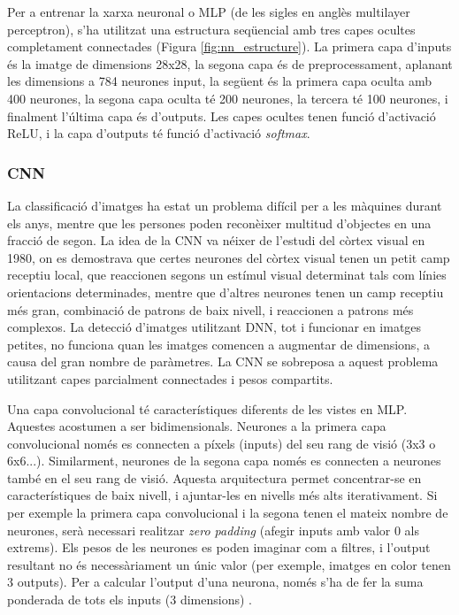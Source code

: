 \documentclass[12pt, spanish]{article}
\begin{document}
Per a entrenar la xarxa neuronal o MLP (de les sigles en anglès multilayer perceptron), s'ha utilitzat una estructura seqüencial amb tres capes ocultes completament connectades (Figura \ref{fig:nn_estructure}). La primera capa d'inputs és la imatge de dimensions 28x28, la segona capa és de preprocessament, aplanant les dimensions a 784 neurones input, la següent és la primera capa oculta amb 400 neurones, la segona capa oculta té 200 neurones, la tercera té 100 neurones, i finalment l'última capa és d'outputs. Les capes ocultes tenen funció d'activació ReLU, i la capa d'outputs té funció d'activació \textit{softmax}. 




\subsubsection{CNN}

La classificació d'imatges ha estat un problema difícil per a les màquines durant els anys, mentre que les persones poden reconèixer multitud d'objectes en una fracció de segon. La idea de la CNN va néixer de l'estudi del còrtex visual en 1980, on es demostrava que certes neurones del còrtex visual tenen un petit camp receptiu local, que reaccionen segons un estímul visual determinat tals com línies orientacions determinades, mentre que d'altres neurones tenen un camp receptiu més gran, combinació de patrons de baix nivell, i reaccionen a patrons més complexos. La detecció d'imatges utilitzant DNN, tot i funcionar en imatges petites, no funciona quan les imatges comencen a augmentar de dimensions, a causa del gran nombre de paràmetres. La CNN se sobreposa a aquest problema utilitzant capes parcialment connectades i pesos compartits. 

Una capa convolucional té característiques diferents de les vistes en MLP. Aquestes acostumen a ser bidimensionals. Neurones a la primera capa convolucional només es connecten a píxels (inputs) del seu rang de visió (3x3 o 6x6...). Similarment, neurones de la segona capa només es connecten a neurones també en el seu rang de visió. Aquesta arquitectura permet concentrar-se en característiques de baix nivell, i ajuntar-les en nivells més alts iterativament. Si per exemple la primera capa convolucional i la segona tenen el mateix nombre de neurones, serà necessari realitzar \textit{zero padding} (afegir inputs amb valor 0 als extrems). Els pesos de les neurones es poden imaginar com a filtres, i l'output resultant no és necessàriament un únic valor (per exemple, imatges en color tenen 3 outputs). Per a calcular l'output d'una neurona, només s'ha de fer la suma ponderada de tots els inputs (3 dimensions) \cite[Cap. 14]{geron2019hands}.
\end{document}

